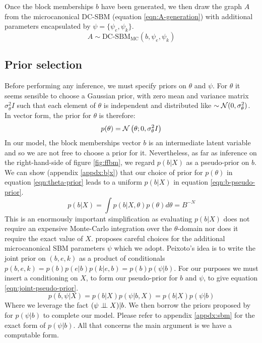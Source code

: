 Once the block memberships $b$ have been generated, we then draw the graph $A$ from the microcanonical DC-SBM (equation \ref{eqn:A-generation}) with additional parameters encapsulated by $\psi = \{\psi_e, \psi_k\}$.
%
\begin{equation}
	A \sim \textrm{DC-SBM}_{\textrm{MC}} (b, \psi_e, \psi_k)
	\label{eqn:A-generation}
\end{equation}


\subsection{Prior selection}

Before performing any inference, we must specify priors on $\theta$ and $\psi$. For $\theta$ it seems sensible to choose a Gaussian prior, with zero mean and variance matrix $\sigma^2_\theta I$ such that each element of $\theta$ is independent and distributed like $\sim \mathcal{N}(0, \sigma_\theta^2)$. In vector form, the prior for $\theta$ is therefore:
%
\begin{equation}
	p(\theta) = \mathcal{N} \left( \theta ; 0, \sigma_\theta^2 I \right)
	\label{eqn:theta-prior}
\end{equation}
%
In our model, the block memberships vector $b$ is an intermediate latent variable and so we are not free to choose a prior for it. Nevertheless, as far as inference on the right-hand-side of figure \ref{fig:ffbm}, we regard $p(b | X)$ as a pseudo-prior on $b$. We can show (appendix \ref{appdx:b|x}) that our choice of prior for $p(\theta)$ in equation \ref{eqn:theta-prior} leads to a uniform $p(b | X)$ in equation \ref{eqn:b-pseudo-prior}.
%
\begin{equation}
	p(b | X) = \int p(b | X, \theta) p(\theta) d\theta = B^{-N}
	\label{eqn:b-pseudo-prior}
\end{equation}
%
This is an enormously important simplification as evaluating $p(b | X)$ does not require an expensive Monte-Carlo integration over the $\theta$-domain nor does it require the exact value of $X$. \citet{Peixoto-Bayesian-Microcanonical} proposes careful choices for the additional microcanonical SBM parameters $\psi$ which we adopt. Peixoto's idea is to write the joint prior on $(b, e, k)$ as a product of conditionals $p(b, e, k) = p(b) p(e | b) p(k | e, b)= p(b) p(\psi | b)$. For our purposes we must insert a conditioning on $X$, to form our pseudo-prior for $b$ and $\psi$, to give equation \ref{eqn:joint-pseudo-prior}.
%
\begin{equation}
	p(b, \psi | X) = p(b | X) p(\psi | b, X) = p(b | X) p(\psi | b)
	\label{eqn:joint-pseudo-prior}
\end{equation}
%
Where we leverage the fact $(\psi \perp \!\!\! \perp X) | b$. We then borrow the priors proposed by \citet{Peixoto-Bayesian-Microcanonical} for $p(\psi | b)$ to complete our model. Please refer to appendix \ref{appdx:sbm} for the exact form of $p(\psi | b)$. All that concerns the main argument is we have a computable form.
